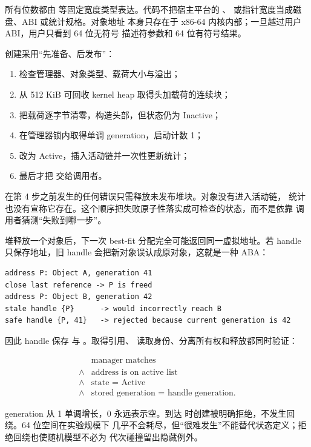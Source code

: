 所有位数都由  等固定宽度类型表达。代码不把宿主平台的
、 或指针宽度当成磁盘、ABI 或统计规格。对象地址
本身只存在于 x86-64 内核内部；一旦越过用户 ABI，用户只看到 64 位无符号
描述符参数和 64 位有符号结果。

创建采用“先准备、后发布”：

\begin{enumerate}
  \item 检查管理器、对象类型、载荷大小与溢出；
  \item 从 512 KiB 可回收 kernel heap 取得头加载荷的连续块；
  \item 把载荷逐字节清零，构造头部，但状态仍为 Inactive；
  \item 在管理器锁内取得单调 generation，启动计数 1；
  \item 改为 Active，插入活动链并一次性更新统计；
  \item 最后才把  交给调用者。
\end{enumerate}

在第 4 步之前发生的任何错误只需释放未发布堆块。对象没有进入活动链，
统计也没有宣称它存在。这个顺序把失败原子性落实成可检查的状态，而不是依靠
调用者猜测“失败到哪一步”。

堆释放一个对象后，下一次 best-fit 分配完全可能返回同一虚拟地址。若 handle
只保存地址，旧 handle 会把新对象误认成原对象，这就是一种 ABA：

\begin{lstlisting}[caption={地址复用时由 generation 拒绝旧 handle}]
address P: Object A, generation 41
close last reference -> P is freed
address P: Object B, generation 42
stale handle {P}      -> would incorrectly reach B
safe handle {P, 41}   -> rejected because current generation is 42
\end{lstlisting}

因此 handle 保存  与 。取得引用、
读取身份、分离所有权和释放都同时验证：

\[
\begin{aligned}
  &\text{manager matches}\\
  {}\land{}&\text{address is on active list}\\
  {}\land{}&\text{state = Active}\\
  {}\land{}&\text{stored generation = handle generation}.
\end{aligned}
\]

generation 从 1 单调增长，0 永远表示空。到达
 时创建被明确拒绝，不发生回绕。64 位空间在实验规模下
几乎不会耗尽，但“很难发生”不能替代状态定义；拒绝回绕也使随机模型不必为
代次碰撞留出隐藏例外。

